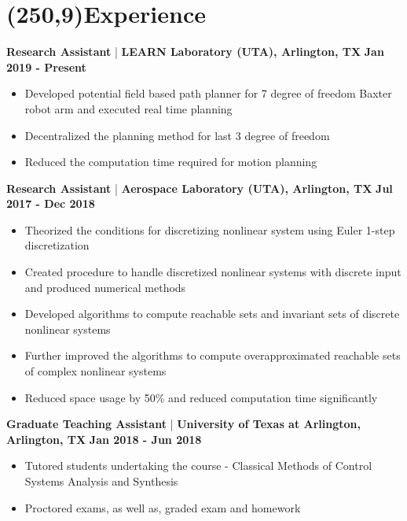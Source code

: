 \documentclass[10pt,a4paper]{extarticle}
\begin{document}
\section*{\colorbox{gray!10}{\makebox(250,9){\textcolor{blue!65}{Experience\hfill}}}}
\textbf{Research Assistant} | \textbf{LEARN Laboratory (UTA), Arlington, TX} \hfill \textbf{Jan 2019 - Present}
\vspace{-0.5em}
\begin{itemize}[leftmargin = 0.6cm]
\setlength\itemsep{-0.2em}
\item Developed potential field based path planner for 7 degree of freedom Baxter robot arm and executed real time planning
\item Decentralized the planning method for last 3 degree of freedom
\item Reduced the computation time required for motion planning
\end{itemize}
\textbf{Research Assistant} | \textbf{Aerospace Laboratory (UTA), Arlington, TX} \hfill \textbf{Jul 2017 - Dec 2018}
\vspace{-0.5em}
\begin{itemize}[leftmargin = 0.6cm]
\setlength\itemsep{-0.2em}
\item Theorized the conditions for discretizing nonlinear system using Euler 1-step discretization %
\item Created procedure to handle discretized nonlinear systems with discrete input and produced numerical methods
\item Developed algorithms to compute reachable sets and invariant sets of discrete nonlinear systems %
\item Further improved the algorithms to compute overapproximated reachable sets of complex nonlinear systems
\item Reduced space usage by 50\% and reduced computation time significantly
\end{itemize}
\textbf{Graduate Teaching Assistant} | \textbf{University of Texas at Arlington, Arlington, TX} \hfill \textbf{Jan 2018 - Jun 2018}
\vspace{-0.5em}
\begin{itemize}[leftmargin = 0.6cm]
\setlength\itemsep{-0.2em}
\item Tutored students undertaking the course - Classical Methods of Control Systems Analysis and Synthesis
\item Proctored exams, as well as, graded exam and homework
\end{itemize}
\end{document}
